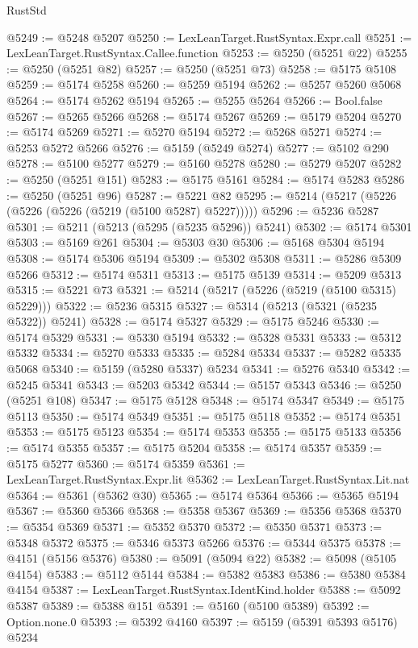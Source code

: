\begin{lexlean}{RustStd}
\begin{coremodule}
@5249 := @5248 @5207
@5250 := LexLeanTarget.RustSyntax.Expr.call
@5251 := LexLeanTarget.RustSyntax.Callee.function
@5253 := @5250 (@5251 @22)
@5255 := @5250 (@5251 @82)
@5257 := @5250 (@5251 @73)
@5258 := @5175 @5108
@5259 := @5174 @5258
@5260 := @5259 @5194
@5262 := @5257 @5260 @5068
@5264 := @5174 @5262 @5194
@5265 := @5255 @5264
@5266 := Bool.false
@5267 := @5265 @5266
@5268 := @5174 @5267
@5269 := @5179 @5204
@5270 := @5174 @5269
@5271 := @5270 @5194
@5272 := @5268 @5271
@5274 := @5253 @5272 @5266
@5276 := @5159 (@5249 @5274)
@5277 := @5102 @290
@5278 := @5100 @5277
@5279 := @5160 @5278
@5280 := @5279 @5207
@5282 := @5250 (@5251 @151)
@5283 := @5175 @5161
@5284 := @5174 @5283
@5286 := @5250 (@5251 @96)
@5287 := @5221 @82
@5295 := @5214 (@5217 (@5226 (@5226 (@5226 (@5219 (@5100 @5287) @5227)))))
@5296 := @5236 @5287
@5301 := @5211 (@5213 (@5295 (@5235 @5296)) @5241)
@5302 := @5174 @5301
@5303 := @5169 @261
@5304 := @5303 @30
@5306 := @5168 @5304 @5194
@5308 := @5174 @5306 @5194
@5309 := @5302 @5308
@5311 := @5286 @5309 @5266
@5312 := @5174 @5311
@5313 := @5175 @5139
@5314 := @5209 @5313
@5315 := @5221 @73
@5321 := @5214 (@5217 (@5226 (@5219 (@5100 @5315) @5229)))
@5322 := @5236 @5315
@5327 := @5314 (@5213 (@5321 (@5235 @5322)) @5241)
@5328 := @5174 @5327
@5329 := @5175 @5246
@5330 := @5174 @5329
@5331 := @5330 @5194
@5332 := @5328 @5331
@5333 := @5312 @5332
@5334 := @5270 @5333
@5335 := @5284 @5334
@5337 := @5282 @5335 @5068
@5340 := @5159 (@5280 @5337) @5234
@5341 := @5276 @5340
@5342 := @5245 @5341
@5343 := @5203 @5342
@5344 := @5157 @5343
@5346 := @5250 (@5251 @108)
@5347 := @5175 @5128
@5348 := @5174 @5347
@5349 := @5175 @5113
@5350 := @5174 @5349
@5351 := @5175 @5118
@5352 := @5174 @5351
@5353 := @5175 @5123
@5354 := @5174 @5353
@5355 := @5175 @5133
@5356 := @5174 @5355
@5357 := @5175 @5204
@5358 := @5174 @5357
@5359 := @5175 @5277
@5360 := @5174 @5359
@5361 := LexLeanTarget.RustSyntax.Expr.lit
@5362 := LexLeanTarget.RustSyntax.Lit.nat
@5364 := @5361 (@5362 @30)
@5365 := @5174 @5364
@5366 := @5365 @5194
@5367 := @5360 @5366
@5368 := @5358 @5367
@5369 := @5356 @5368
@5370 := @5354 @5369
@5371 := @5352 @5370
@5372 := @5350 @5371
@5373 := @5348 @5372
@5375 := @5346 @5373 @5266
@5376 := @5344 @5375
@5378 := @4151 (@5156 @5376)
@5380 := @5091 (@5094 @22)
@5382 := @5098 (@5105 @4154)
@5383 := @5112 @5144
@5384 := @5382 @5383
@5386 := @5380 @5384 @4154
@5387 := LexLeanTarget.RustSyntax.IdentKind.holder
@5388 := @5092 @5387
@5389 := @5388 @151
@5391 := @5160 (@5100 @5389)
@5392 := Option.none.{0}
@5393 := @5392 @4160
@5397 := @5159 (@5391 @5393 @5176) @5234

\end{coremodule}
\end{lexlean}
